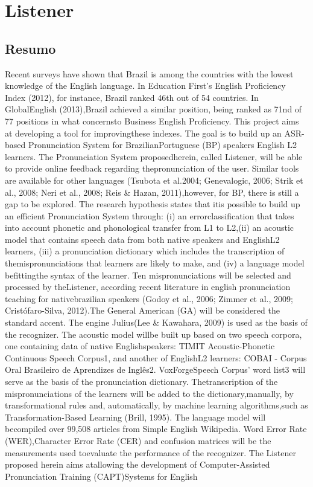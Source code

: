
\chapter{Listener}\label{ch:listener}

\section*{Resumo}
Recent surveys have shown that Brazil is among the countries with the lowest knowledge of the English language. In Education First's English Proficiency Index (2012), for instance, Brazil ranked 46th out of 54 countries. In GlobalEnglish (2013),Brazil achieved a similar position, being ranked as 71nd of 77 positions in what concernsto Business English Proficiency. This project aims at developing a tool for improvingthese indexes. The goal is to build up an ASR-based Pronunciation System for BrazilianPortuguese (BP) speakers English L2 learners. The Pronunciation System proposedherein, called Listener, will be able to provide online feedback regarding thepronunciation of the user. Similar tools are available for other languages (Tsubota et al.2004; Genevalogic, 2006; Strik et al., 2008; Neri et al., 2008; Reis & Hazan, 2011),however, for BP, there is still a gap to be explored. The research hypothesis states that itis possible to build up an efficient Pronunciation System through: (i) an errorclassification that takes into account phonetic and phonological transfer from L1 to L2,(ii) an acoustic model that contains speech data from both native speakers and EnglishL2 learners, (iii) a pronunciation dictionary which includes the transcription of themispronunciations that learners are likely to make, and (iv) a language model befittingthe syntax of the learner. Ten mispronunciations will be selected and processed by theListener, according recent literature in english pronunciation teaching for nativebrazilian speakers (Godoy et al., 2006; Zimmer et al., 2009; Cristófaro-Silva, 2012).The General American (GA) will be considered the standard accent. The engine Julius(Lee & Kawahara, 2009) is used as the basis of the recognizer. The acoustic model willbe built up based on two speech corpora, one containing data of native Englishspeakers: TIMIT Acoustic-Phonetic Continuous Speech Corpus1, and another of EnglishL2 learners: COBAI - Corpus Oral Brasileiro de Aprendizes de Inglês2. VoxForgeSpeech Corpus' word list3 will serve as the basis of the pronunciation dictionary. Thetranscription of the mispronunciations of the learners will be added to the dictionary,manually, by transformational rules and, automatically, by machine learning algorithms,such as Transformation-Based Learning (Brill, 1995). The language model will becompiled over 99,508 articles from Simple English Wikipedia. Word Error Rate (WER),Character Error Rate (CER) and confusion matrices will be the measurements used toevaluate the performance of the recognizer. The Listener proposed herein aims atallowing the development of Computer-Assisted Pronunciation Training (CAPT)Systems for English



